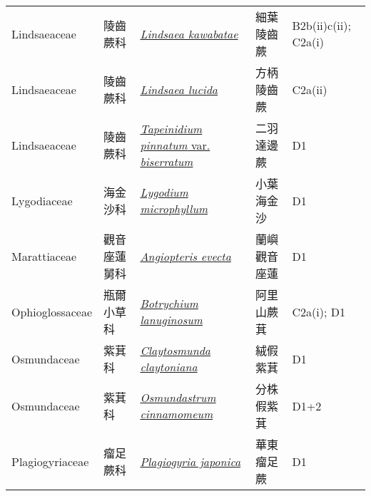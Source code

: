 {\begin{longtable}{p{2.5cm}p{2.5cm}p{4.5cm}p{2.5cm}p{3cm}}
    Lindsaeaceae & 陵齒蕨科 & \href{http://www.theplantlist.org/tpl1.1/search?q=Lindsaea+kawabatae}{\textit{Lindsaea kawabatae} } & 細葉陵齒蕨 & B2b(ii)c(ii); C2a(i) \index{Lindsaea@\textit{Lindsaea}!kawabatae@\textit{kawabatae}}  \index{細葉陵齒蕨} \\
    Lindsaeaceae & 陵齒蕨科 & \href{http://www.theplantlist.org/tpl1.1/search?q=Lindsaea+lucida}{\textit{Lindsaea lucida} } & 方柄陵齒蕨 & C2a(ii) \index{Lindsaea@\textit{Lindsaea}!lucida@\textit{lucida}}  \index{方柄陵齒蕨} \\
    Lindsaeaceae & 陵齒蕨科 & \href{http://www.theplantlist.org/tpl1.1/search?q=Tapeinidium+pinnatum+var.+biserratum}{\textit{Tapeinidium pinnatum} var. \textit{biserratum} } & 二羽達邊蕨 & D1 \index{Tapeinidium@\textit{Tapeinidium}!pinnatum@\textit{pinnatum}!var. biserratum@var. \textit{biserratum}}  \index{二羽達邊蕨} \\
    Lygodiaceae & 海金沙科 & \href{http://www.theplantlist.org/tpl1.1/search?q=Lygodium+microphyllum}{\textit{Lygodium microphyllum} } & 小葉海金沙 & D1 \index{Lygodium@\textit{Lygodium}!microphyllum@\textit{microphyllum}}  \index{小葉海金沙} \\
    Marattiaceae & 觀音座蓮舅科 & \href{http://www.theplantlist.org/tpl1.1/search?q=Angiopteris+evecta}{\textit{Angiopteris evecta} } & 蘭嶼觀音座蓮 & D1 \index{Angiopteris@\textit{Angiopteris}!evecta@\textit{evecta}}  \index{蘭嶼觀音座蓮} \\
    Ophioglossaceae & 瓶爾小草科 & \href{http://www.theplantlist.org/tpl1.1/search?q=Botrychium+lanuginosum}{\textit{Botrychium lanuginosum} } & 阿里山蕨萁 & C2a(i); D1 \index{Botrychium@\textit{Botrychium}!lanuginosum@\textit{lanuginosum}}  \index{阿里山蕨萁} \\
    Osmundaceae & 紫萁科 & \href{http://www.theplantlist.org/tpl1.1/search?q=Claytosmunda+claytoniana}{\textit{Claytosmunda claytoniana} } & 絨假紫萁 & D1 \index{Claytosmunda@\textit{Claytosmunda}!claytoniana@\textit{claytoniana}}  \index{絨假紫萁} \\
    Osmundaceae & 紫萁科 & \href{http://www.theplantlist.org/tpl1.1/search?q=Osmundastrum+cinnamomeum}{\textit{Osmundastrum cinnamomeum} } & 分株假紫萁 & D1+2 \index{Osmundastrum@\textit{Osmundastrum}!cinnamomeum@\textit{cinnamomeum}}  \index{分株假紫萁} \\
    Plagiogyriaceae & 瘤足蕨科 & \href{http://www.theplantlist.org/tpl1.1/search?q=Plagiogyria+japonica}{\textit{Plagiogyria japonica} } & 華東瘤足蕨 & D1 \index{Plagiogyria@\textit{Plagiogyria}!japonica@\textit{japonica}}  \index{華東瘤足蕨} \\

\end{longtable}}
